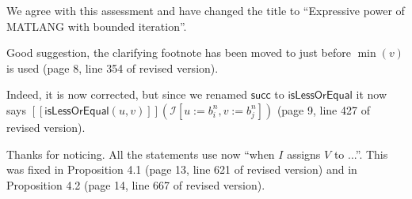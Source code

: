 
\bigskip

\begin{comment}
	(\ldots) I believe the title is too general. The authors study a *specific* query language, i.e., MATLANG. I understand you study fragments of it, and thus you have languageS, but I feel the title is a bit deceiving. I would make more explicit the content of the paper, specifying it is about the expressive power of MATLANG with iteration.
\end{comment}

\answer We agree with this assessment and have changed the title to ``Expressive power of MATLANG with bounded iteration''.
\bigskip

\begin{comment}
When you introduce the $\min(v)$ expression for the first time (after Proposition 3.4) I would anticipate you will explain how to express it in for-MATLANG in the next section.
\end{comment}

\answer Good suggestion, the clarifying footnote has been moved to just before $\min(v)$ is used (page 8, line 354 of revised version).
\bigskip

\begin{comment}
	In page 9, definition of $succ(b_i^n,b_j^n)$, I guess you mean $[[succ(u,v)]](I)$, where $I$ maps $u$ and $v$ to $b_i^n$, and $b_j^n$. Similarly for $Prev \cdot b_i^n$.
\end{comment}

\answer Indeed, it is now corrected, but since we renamed $\mathsf{succ}$ to $\mathsf{isLessOrEqual}$ it now says $[[ \mathsf{isLessOrEqual}(u,v)]](\mathcal{I}[u:=b_i^n,v:=b_j^n])$ (page 9, line 427 of revised version).
\bigskip

\begin{comment}
	Proposition 4.3: here you use the expression ``when $I$ assigns $V$ to $A$''. In similar claims, like Proposition 4.2, you do not say anything about what $I$ does to $V$, and in Proposition 4.1 you use the function $mat$ to state what is the value of $V$. Please make these equivalence statements more uniform.
\end{comment}

\answer Thanks for noticing. All the statements use now ``when $I$ assigns $V$ to ...''. This was fixed in Proposition 4.1 (page 13, line 621 of revised version) and in Proposition 4.2 (page 14, line 667 of revised version).
\bigskip

